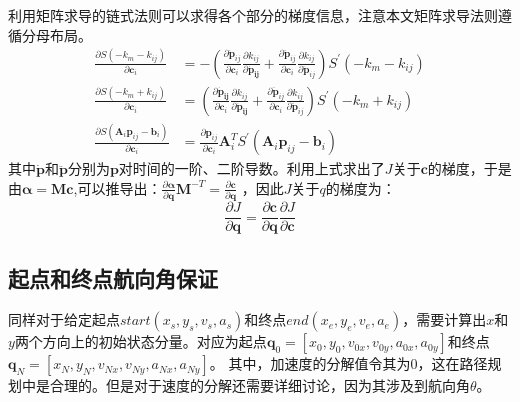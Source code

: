 \documentclass[master,academic]{ysuthesis} %
\begin{document}
		利用矩阵求导的链式法则可以求得各个部分的梯度信息，注意本文矩阵求导法则遵循分母布局。
		\begin{equation}
			\begin{aligned}
				\frac{\partial S( -k_m-k_{ij} )}{\partial \bm{c}_i}&=-( \frac{\partial \dot{\bm{p}}_{ij}}{\partial \bm{c}_i}\frac{\partial k_{ij}}{\partial \bm{\dot{\bm{p}}_{ij}}}+\frac{\partial \ddot{\bm{p}}_{ij}}{\partial \bm{c}_i}\frac{\partial k_{ij}}{\partial \ddot{\bm{p}}_{ij}} ) S^{'} ( -k_m-k_{ij} ) \\
				\frac{\partial S( -k_m+k_{ij} )}{\partial \bm{c}_i}&=( \frac{\partial \bm{\dot{\bm{p}}_{ij}}}{\partial \bm{c}_i}\frac{\partial k_{ij}}{\partial \bm{\dot{\bm{p}}_{ij}}}+\frac{\partial \ddot{\bm{p}}_{ij}}{\partial \bm{c}_i}\frac{\partial k_{ij}}{\partial \ddot{\bm{p}}_{ij}} ) S^{'} ( -k_m+k_{ij} ) \\
				\frac{\partial S( \bm{A}_i\bm{p}_{ij}-\bm{b}_{i} )}{\partial \bm{c}_i}&=\frac{\partial \bm{p}_{ij}}{\partial \bm{c}_i}\bm{A}_{i}^{T}S^{'}( \bm{A}_i\bm{p}_{ij}-\bm{b}_{i} ) 
			\end{aligned}
		\end{equation}
		其中$\dot{\bm{p}}$和$\ddot{\bm{p}}$分别为$\bm{p}$对时间的一阶、二阶导数。利用上式求出了$J$关于$\bm{c}$的梯度，于是由$\bm{\alpha} = \bm{M}\bm{c}$,可以推导出：$\frac{\partial \bm{\alpha}}{\partial \bm{q}}\bm{M}^{-T}=\frac{\partial \bm{c}}{\partial \bm{q}}$ ，因此$J$关于$q$的梯度为：
		\begin{equation}
			\frac{\partial J}{\partial \bm{q}}=\frac{\partial \bm{c}}{\partial \bm{q}}\frac{\partial J}{\partial \bm{c}}
		\end{equation}

		\subsection{起点和终点航向角保证}
		同样对于给定起点$start(x_s,y_s,v_s,a_s)$和终点$end(x_e,y_e,v_e,a_e)$，需要计算出$x$和$y$两个方向上的初始状态分量。对应为起点$\bm{q}_{0}=[x_0,y_0,v_{0x},v_{0y},a_{0x},a_{0y}]$和终点$\bm{q}_{N}=[x_N,y_N,v_{Nx},v_{Ny},a_{Nx},a_{Ny}]$。 其中，加速度的分解值令其为0，这在路径规划中是合理的。但是对于速度的分解还需要详细讨论，因为其涉及到航向角$\theta$。
\end{document}
